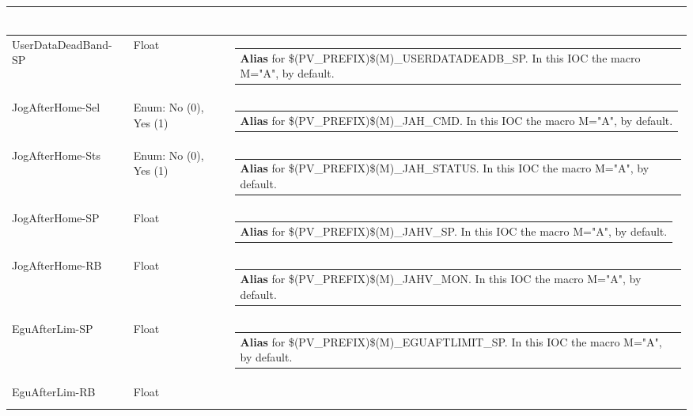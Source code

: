 \documentclass[openany]{article}
\begin{document}
\begin{longtable}{| m{4.5cm} m{2.5cm}  m{8.5cm} |}
\begin{tabular}{@{}m{6cm}@{}}
            \end{tabular} \hypertarget{pv:user-data-deadband}{}\\ \hline
        UserDataDeadBand-SP & Float & \begin{tabular}{@{}m{6cm}@{}}
                \textbf{\color{blue} Alias} for \$(PV\_PREFIX)\$(M)\_USERDATADEADB\_SP. In this IOC the macro M="A", by default.
            \end{tabular} \hypertarget{pv:jog-after-home-sel}{}\\ \hline
        JogAfterHome-Sel & Enum: No (0), Yes (1) & \begin{tabular}{@{}m{6cm}@{}}
                \textbf{\color{blue} Alias} for \$(PV\_PREFIX)\$(M)\_JAH\_CMD. In this IOC the macro M="A", by default.
            \end{tabular} \hypertarget{}{}\\ \hline
        JogAfterHome-Sts & Enum: No (0), Yes (1) & \begin{tabular}{@{}m{6cm}@{}}
                \textbf{\color{blue} Alias} for \$(PV\_PREFIX)\$(M)\_JAH\_STATUS. In this IOC the macro M="A", by default.
            \end{tabular} \hypertarget{pv:jog-after-home-sp}{}\\ \hline
        JogAfterHome-SP & Float & \begin{tabular}{@{}m{6cm}@{}}
                \textbf{\color{blue} Alias} for \$(PV\_PREFIX)\$(M)\_JAHV\_SP. In this IOC the macro M="A", by default.
            \end{tabular} \hypertarget{}{}\\ \hline
        JogAfterHome-RB & Float & \begin{tabular}{@{}m{6cm}@{}}
                \textbf{\color{blue} Alias} for \$(PV\_PREFIX)\$(M)\_JAHV\_MON. In this IOC the macro M="A", by default.
            \end{tabular} \hypertarget{pv:egu-after-lim}{}\\ \hline
        EguAfterLim-SP & Float & \begin{tabular}{@{}m{6cm}@{}}
                \textbf{\color{blue} Alias} for \$(PV\_PREFIX)\$(M)\_EGUAFTLIMIT\_SP. In this IOC the macro M="A", by default.
            \end{tabular} \hypertarget{}{}\\ \hline
        EguAfterLim-RB & Float & \begin{tabular}{@{}m{6cm}@{}}

\end{tabular}
\end{longtable}
\end{document}
